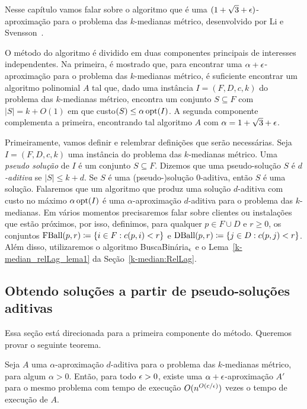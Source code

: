 Nesse capítulo vamos falar sobre o algoritmo que é uma $(1 + \sqrt{3} + \epsilon)$-aproximação para o problema das $k$-medianas métrico, desenvolvido por Li e Svensson~\cite{li2012}.

O método do algoritmo é dividido em duas componentes principais de interesses independentes. Na primeira, é mostrado que, para encontrar uma $\alpha + \epsilon$-aproximação para o problema das $k$-medianas métrico, é suficiente encontrar um algoritmo polinomial $A$ tal que, dado uma instância $I = (F,D,c,k)$ do problema das $k$-medianas métrico, encontra um conjunto $S \subseteq F$ com $|S| = k + O(1)$ em que custo$(S) \leq \alpha \, \mathrm{opt}(I) $. A segunda componente complementa a primeira, encontrando tal algoritmo $A$ com ${\alpha =  1 + \sqrt{3} + \epsilon}$.

Primeiramente, vamos definir e relembrar definições que serão necessárias. Seja $I = (F,D,c,k)$ uma instância do problema das $k$-medianas métrico. Uma \emph{pseudo solução} de $I$ é um conjunto $S \subseteq F$. Dizemos que uma pseudo-solução $S$ é \emph{$d$-aditiva} se $|S| \leq k + d$. Se $S$ é uma (pseudo-)solução $0$-aditiva, então $S$ é uma solução. Falaremos que um algoritmo que produz uma solução $d$-aditiva com custo no máximo $\alpha\, \mathrm{opt}(I)$ é uma $\alpha$-aproximação $d$-aditiva para o problema das $k$-medianas.
Em vários momentos precisaremos falar sobre clientes ou instalações que estão próximos, por isso, definimos, para qualquer $p \in F \cup D$ e $r \geq 0$, os conjuntos ${\text{FBall}(p,r) \coloneq \{i \in F: c(p,i) < r\}}$ e ${\text{DBall}(p,r) \coloneqq \{j \in D: c(p,j) < r\}}$.
Além disso, utilizaremos o algoritmo {\sc BuscaBinária$_\epsilon$} e o Lema~\ref{k-median_relLag_lema1} da Seção~\ref{k-median:RelLag}.

\subsection{Obtendo soluções a partir de pseudo-soluções aditivas}

Essa seção está direcionada para a primeira componente do método. Queremos provar o seguinte teorema.

\begin{theorem}
    Seja $A$ uma $\alpha$-aproximação $d$-aditiva para o problema das $k$-medianas métrico, para algum $\alpha >0$. Então, para todo $\epsilon > 0$, existe uma $\alpha + \epsilon$-aproximação $A'$ para o mesmo problema com tempo de execução $O(n^{O(c/\epsilon)})$ vezes o tempo de execução de $A$.
\end{theorem}


